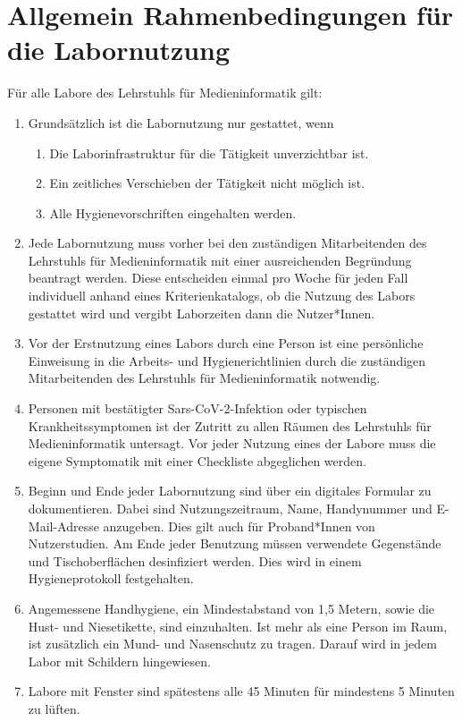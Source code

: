\section{Allgemein Rahmenbedingungen für die Labornutzung}

\noindent
Für alle Labore des Lehrstuhls für Medieninformatik gilt:

\begin{enumerate}
    \item Grundsätzlich ist die Labornutzung nur gestattet, wenn
    \begin{enumerate}
        \item Die Laborinfrastruktur für die Tätigkeit unverzichtbar ist.
        \item Ein zeitliches Verschieben der Tätigkeit nicht möglich ist.
        \item Alle Hygienevorschriften eingehalten werden.
    \end{enumerate}
    \item{Jede Labornutzung muss vorher bei den zuständigen Mitarbeitenden des Lehrstuhls für Medieninformatik mit einer ausreichenden Begründung beantragt werden.
    Diese entscheiden einmal pro Woche für jeden Fall individuell anhand eines Kriterienkatalogs, ob die Nutzung des Labors gestattet wird und vergibt Laborzeiten dann die Nutzer*Innen.}
    \item{Vor der Erstnutzung eines Labors durch eine Person ist eine persönliche Einweisung in die Arbeits- und Hygienerichtlinien durch die zuständigen Mitarbeitenden des Lehrstuhls für Medieninformatik notwendig.}
    \item{Personen mit bestätigter Sars-CoV-2-Infektion oder typischen Krankheitssymptomen ist der Zutritt zu allen Räumen des Lehrstuhls für Medieninformatik untersagt.
    Vor jeder Nutzung eines der Labore muss die eigene Symptomatik mit einer Checkliste abgeglichen werden.}
    \item{Beginn und Ende jeder Labornutzung sind über ein digitales Formular zu dokumentieren.
    Dabei sind Nutzungszeitraum, Name, Handynummer und E-Mail-Adresse anzugeben.
    Dies gilt auch für Proband*Innen von Nutzerstudien.
    Am Ende jeder Benutzung müssen verwendete Gegenstände und Tischoberflächen desinfiziert werden.
    Dies wird in einem Hygieneprotokoll festgehalten.}
    \item{Angemessene Handhygiene, ein Mindestabstand von 1,5 Metern, sowie die Hust- und Niesetikette, sind einzuhalten.
    Ist mehr als eine Person im Raum, ist zusätzlich ein Mund- und Nasenschutz zu tragen.
    Darauf wird in jedem Labor mit Schildern hingewiesen.}
    \item{Labore mit Fenster sind spätestens alle 45 Minuten für mindestens 5 Minuten zu lüften.}
\end{enumerate}
